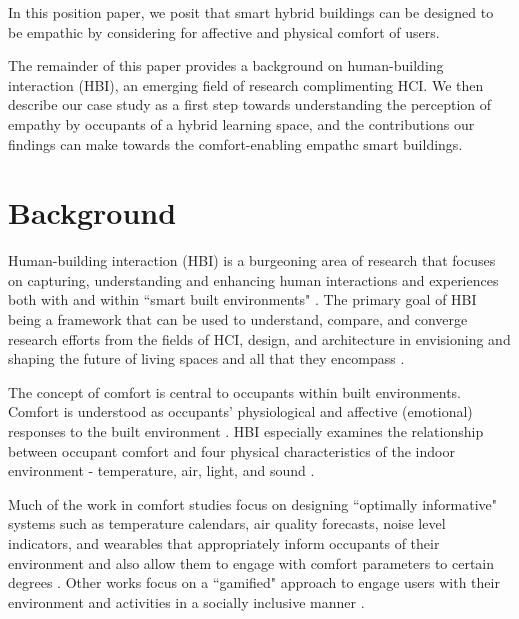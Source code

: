 \documentclass[manuscript, anonymous, review]{acmart}
\begin{document}

In this position paper, we posit that smart hybrid buildings can be designed to be empathic by considering for affective and physical comfort of users.  

The remainder of this paper provides a background on human-building interaction (HBI), an emerging field of research complimenting HCI. We then describe our case study as a first step towards understanding the perception of empathy by occupants of a hybrid learning space, and the contributions our findings can make towards the comfort-enabling empathc smart buildings.


\section{Background}
Human-building interaction (HBI) is a burgeoning area of research that focuses on capturing, understanding and enhancing human interactions and experiences both with and within ``smart built environments" \cite{alavi2016future}. The primary goal of HBI being a framework that can be used to understand, compare, and converge research efforts from the fields of HCI, design, and architecture in envisioning and shaping the future of living spaces and all that they encompass \cite{nembrini2017human, alavi2018artifacts}. 

The concept of comfort is central to occupants within built environments. Comfort is understood as occupants' physiological and affective (emotional) responses to the built environment \cite{alavi2017comfort}. HBI especially examines the relationship between occupant comfort and four physical characteristics of the indoor environment - temperature, air, light, and sound \cite{hawkes2007environmental, bluyssen2009indoor}. 

Much of the work in comfort studies focus on designing ``optimally informative" systems such as temperature calendars, air quality forecasts, noise level indicators, and wearables that appropriately inform occupants of their environment and also allow them to engage with comfort parameters to certain degrees  \cite{costanza2016bit, milenkovic2013improving, kim2020designing}. Other works focus on a ``gamified" approach to engage users with their environment and activities in a socially inclusive manner \cite{mathur2015tiny, kwallek1997impact, zhong2022augmenting}. 
\end{document}
